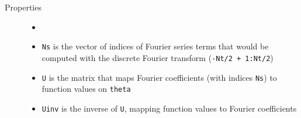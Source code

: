 \begin{description}
 \item[Properties]
   \begin{itemize}
    \item[] %
    \item {\tt Ns} is the vector of indices of Fourier series terms that
                 would be computed with the discrete Fourier transform
                 ({\tt -Nt/2 + 1:Nt/2})
    \item {\tt U} is the matrix that maps Fourier coefficients 
                  (with indices {\tt Ns}) to function values on
                  {\tt theta}
    \item {\tt Uinv} is the inverse of {\tt U}, mapping function values
                  to Fourier coefficients
   \end{itemize}


\end{description}

